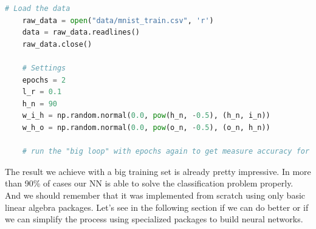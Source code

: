 \begin{lstlisting}[language=Python]   
    # Load the data
    raw_data = open("data/mnist_train.csv", 'r')
    data = raw_data.readlines()
    raw_data.close()
    
    # Settings
    epochs = 2
    l_r = 0.1
    h_n = 90
    w_i_h = np.random.normal(0.0, pow(h_n, -0.5), (h_n, i_n))
    w_h_o = np.random.normal(0.0, pow(o_n, -0.5), (o_n, h_n))
    
    # run the "big loop" with epochs again to get measure accuracy for new settings.
\end{lstlisting}

The result we achieve with a big training set is already pretty impressive. In more than 90\% of cases our NN is able to solve the classification problem properly. And we should remember that it was implemented from scratch using only basic linear algebra packages. Let's see in the following section if we can do better or if we can simplify the process using specialized packages to build neural networks.